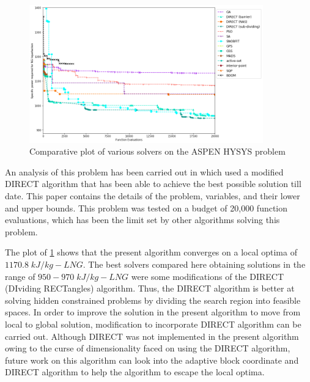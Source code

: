 \begin{figure}[h]
\includegraphics[width=0.9\textwidth]{img/ASPEN_problem.png}
\caption{Comparative plot of various solvers on the ASPEN HYSYS problem}
\label{fig:ASPEN_prob}
\end{figure}

\bigskip
\noindent
An analysis of this problem has been carried out in \cite{Na2017} which used a modified DIRECT algorithm that has been able to achieve the best possible solution till date. This paper contains the details of the problem, variables, and their lower and upper bounds. This problem was tested on a budget of 20,000 function evaluations, which has been the limit set by other algorithms solving this problem. 

\bigskip
\noindent
The plot of \ref{fig:ASPEN_prob} shows that the present algorithm converges on a local optima of $1170.8 \; kJ/kg-LNG$. The best solvers compared here obtaining solutions in the range of $950-970 \; kJ/kg-LNG$ were some modifications of the DIRECT (DIviding RECTangles) algorithm. Thus, the DIRECT algorithm is better at solving hidden constrained problems by dividing the search region into feasible spaces. In order to improve the solution in the present algorithm to move from local to global solution, modification to incorporate DIRECT algorithm can be carried out. Although DIRECT was not implemented in the present algorithm owing to the curse of dimensionality faced on using the DIRECT algorithm, future work on this algorithm can look into the adaptive block coordinate and DIRECT algorithm \cite{Tao2017} to help the algorithm to escape the local optima.